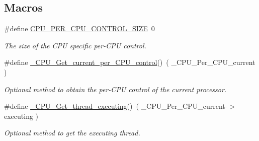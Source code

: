\subsection*{Macros}
\begin{DoxyCompactItemize}
\item 
\#define \mbox{\hyperlink{group__RTEMSScoreCPUExample_gaf8e38596ad3db49995fd8eb9fb4e86b2}{C\+P\+U\+\_\+\+P\+E\+R\+\_\+\+C\+P\+U\+\_\+\+C\+O\+N\+T\+R\+O\+L\+\_\+\+S\+I\+ZE}}~0
\begin{DoxyCompactList}\small\item\em The size of the C\+PU specific per-\/\+C\+PU control. \end{DoxyCompactList}\item 
\#define \mbox{\hyperlink{group__RTEMSScoreCPUExample_ga026af6cb089314aa4eac9e276624953e}{\+\_\+\+C\+P\+U\+\_\+\+Get\+\_\+current\+\_\+per\+\_\+\+C\+P\+U\+\_\+control}}()~( \+\_\+\+C\+P\+U\+\_\+\+Per\+\_\+\+C\+P\+U\+\_\+current )
\begin{DoxyCompactList}\small\item\em Optional method to obtain the per-\/\+C\+PU control of the current processor. \end{DoxyCompactList}\item 
\#define \mbox{\hyperlink{group__RTEMSScoreCPUExample_gadcdca3586eca8c4286b18312eac9087f}{\+\_\+\+C\+P\+U\+\_\+\+Get\+\_\+thread\+\_\+executing}}()~( \+\_\+\+C\+P\+U\+\_\+\+Per\+\_\+\+C\+P\+U\+\_\+current-\/$>$executing )
\begin{DoxyCompactList}\small\item\em Optional method to get the executing thread. \end{DoxyCompactList}\end{DoxyCompactItemize}
